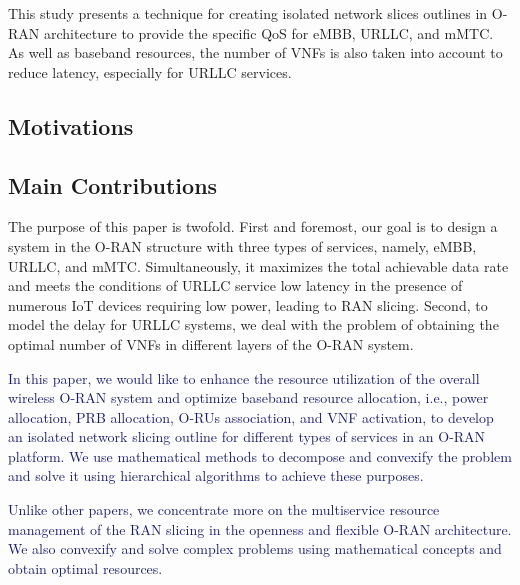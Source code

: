 \documentclass[lettersize,journal]{IEEEtran}
\begin{document}
This study presents a technique for creating isolated network slices outlines in O-RAN architecture to provide the specific QoS for eMBB, URLLC, and mMTC. As well as baseband resources, the number of VNFs is also taken into account to reduce latency, especially for URLLC services.

\subsection{Motivations}

\subsection{Main Contributions}
The purpose of this paper is twofold. First and foremost, our goal is to design a system in the O-RAN structure with three types of services, namely, eMBB, URLLC, and mMTC. Simultaneously, it maximizes the total achievable data rate and meets the conditions of URLLC service low latency in the presence of numerous IoT devices requiring low power, leading to RAN slicing. Second, to model the delay for URLLC systems, we deal with the problem of obtaining the optimal number of VNFs in different layers of the O-RAN system.

\textcolor{MidnightBlue}{In this paper, we would like to enhance the resource utilization of the overall wireless O-RAN system and optimize baseband resource allocation, i.e., power allocation, PRB allocation, O-RUs association, and VNF activation, to develop an isolated network slicing outline for different types of services in an O-RAN platform.
We use mathematical methods to decompose and convexify the problem and solve it using hierarchical algorithms to achieve these purposes.}

\textcolor{MidnightBlue}{Unlike other papers, we concentrate more on the multiservice resource management of the RAN slicing in the openness and flexible O-RAN architecture. We also convexify and solve complex problems using mathematical concepts and obtain optimal resources.}
\end{document}

